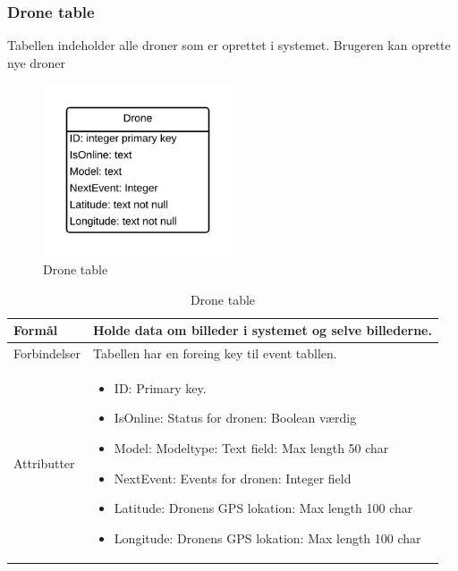 \subsubsection*{Drone table}
Tabellen indeholder alle droner som er oprettet i systemet. Brugeren kan oprette nye droner
\vspace{-5pt}
\begin{figure}[H]
	\centering
	\includegraphics[width=0.5\textwidth]{Billeder/database/DroneTable.png}
	\vspace{-5pt}
	\caption{Drone table}
	\label{fig:drone_table}
\end{figure}

\begin{table}[H]
\begin{tabular}{| p{3cm}| p{11.5cm}|}
\hline

Formål	 							& Holde data om billeder i systemet og selve billederne.\\\hline
Forbindelser						& Tabellen har en foreing key til event tabllen.\\\hline
Attributter						& \begin{itemize}
												\item ID: Primary key.
												\item IsOnline: Status for dronen: Boolean værdig
												\item Model: Modeltype: Text field: Max length 50 char
												\item NextEvent: Events for dronen: Integer field
												\item Latitude: Dronens GPS lokation: Max length 100 char  
												\item Longitude: Dronens GPS lokation: Max length 100 char
											\end{itemize} \\\hline 
\end{tabular}
\caption{Drone table}
\label{tab:drone_table}
\end{table}
